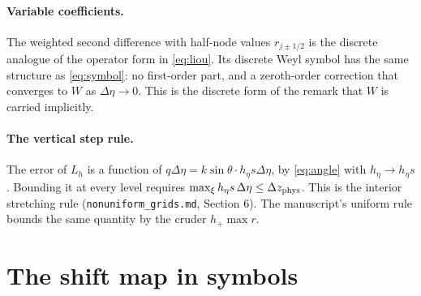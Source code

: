 \documentclass[11pt]{article}
\begin{document}
\paragraph{Variable coefficients.} The weighted second difference with
half-node values $r_{j\pm1/2}$ is the discrete analogue of the operator form in
\eqref{eq:liou}. Its discrete Weyl symbol has the same structure as
\eqref{eq:symbol}: no first-order part, and a zeroth-order correction that
converges to $W$ as $\Delta\eta\to0$. This is the discrete form of the remark
that $W$ is carried implicitly.

\paragraph{The vertical step rule.} The error of $L_h$ is a function of
$q\Delta\eta=k\sin\theta\cdot h_\eta s\Delta\eta$, by \eqref{eq:angle} with
$h_\eta\to h_\eta s$. Bounding it at every level requires
$\max_\xi h_\eta s\,\Delta\eta\le\Delta z_{\rm phys}$. This is the interior
stretching rule (\texttt{nonuniform\_grids.md}, Section 6). The manuscript's
uniform rule bounds the same quantity by the cruder $h_+\max r$.

\section{The shift map in symbols}
\end{document}
